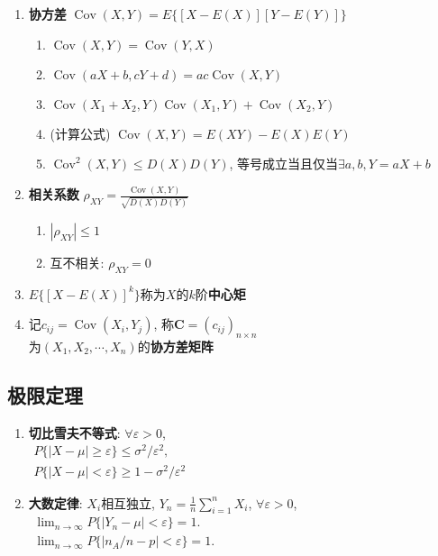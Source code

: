 \documentclass[10pt,a4paper,nofonts]{ctexart}
\newcommand{\D}{\displaystyle}
\renewcommand{\le}{\leqslant}
\renewcommand{\ge}{\geqslant}
\DeclareMathOperator{\Cov}{Cov}
\begin{document}
\begin{multicols}{2}
\begin{enumerate}
\item {\bf 协方差} $\Cov(X,Y)=E\{[X-E(X)][Y-E(Y)]\}$
\begin{enumerate}[label={\sf 性质\arabic*}]
\item $\Cov(X,Y)=\Cov(Y,X)$
\item $\Cov(aX+b,cY+d)=ac\Cov(X,Y)$
\item $\Cov(X_1+X_2,Y)\Cov(X_1,Y)+\Cov(X_2,Y)$
\item (计算公式) $\Cov(X,Y)=E(XY)-E(X)E(Y)$
\item $\Cov^2(X,Y)\le D(X)D(Y)$, 等号成立当且仅当$\exists a,b, Y=aX+b$
\end{enumerate}

\item {\bf 相关系数} $\rho_{XY}=\D\frac{\Cov(X,Y)}{\sqrt{D(X)D(Y)}}$
\begin{enumerate}
\item $|\rho_{XY}|\le 1$
\item 互不相关: $\rho_{XY}=0$
\end{enumerate}

\item $E\{[X-E(X)]^k\}$称为$X$的$k$阶{\bf 中心矩}
\item 记$c_{ij}=\Cov(X_i,Y_j)$, 称$\bm C =(c_{ij})_{n\times n}$\\为$(X_1,X_2,\cdots,X_n)$的{\bf 协方差矩阵}

\end{enumerate}

\subsection{极限定理}

\begin{enumerate}

\item {\bf 切比雪夫不等式}: $\forall \varepsilon>0$,\\
$\begin{array}{l}
P\{|X-\mu|\ge\varepsilon\}\le\sigma^2/\varepsilon^2,\\
P\{|X-\mu|<\varepsilon\}\ge1-\sigma^2/\varepsilon^2
\end{array}$

\item {\bf 大数定律}: $X_i$相互独立, $Y_n=\frac{1}{n}\sum_{i=1}^{n}X_i$, $\forall \varepsilon>0$,\\
$\begin{array}{l}
\lim_{n\to\infty}P\{|Y_n-\mu|<\varepsilon\}=1.\\
\lim_{n\to\infty}P\{|n_A/n-p|<\varepsilon\}=1.
\end{array}$


\end{enumerate}
\end{multicols}
\end{document}
